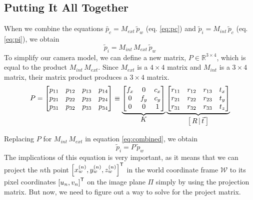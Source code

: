 \subsection{Putting It All Together}

When we combine the equations $\widetilde{p_c} = M_{ext}\,\widetilde{p}_w$ (eq. \ref{eq:pc}) and $\widetilde{p}_i = M_{int}\,\widetilde{p}_c$ (eq. \ref{eq:pi}), we obtain
\begin{equation} \label{eq:combined}
    \widetilde{p}_{i} = M_{int}\,M_{ext}\,\widetilde{p}_{w}
\end{equation}
To simplify our camera model, we can define a new matrix, $P \in \mathbb{R}^{3 \times 4}$, which is equal to the product $M_{int}\,M_{ext}$. Since $M_{ext}$ is a $4 \times 4$ matrix and $M_{int}$ is a $3 \times 4$ matrix, their matrix product produces a $3 \times 4$ matrix.
\begin{equation}  
    P=
    \begin{bmatrix}
        p_{11} & p_{12} & p_{13} & p_{14} \\
        p_{21} & p_{22} & p_{23} & p_{24} \\
        p_{31} & p_{32} & p_{33} & p_{34}
    \end{bmatrix}
    \equiv
    \underbrace{
        \begin{bmatrix}
            f_x & 0   & c_x  \\
            0   & f_y & c_y  \\
            0   & 0   & 1   
        \end{bmatrix}
    }_{\mathlarger{K}}
    \underbrace{
        \begin{bmatrix}
            r_{11} & r_{12} & r_{13} & t_x \\
            r_{21} & r_{22} & r_{23} & t_y \\
            r_{31} & r_{32} & r_{33} & t_z \\
        \end{bmatrix}
    }_{\mathlarger{\left[\,R\,\vert\,\vec{t}\:\right]}}
\end{equation}

Replacing $P$ for $M_{int}\,M_{ext}$ in equation \ref{eq:combined}, we obtain
\begin{equation} \label{eq:project}
    \widetilde{p}_{i} = P\,\widetilde{p}_{w}
\end{equation}
The implications of this equation is very important, as it means that we can project the $n$th point $\left[ x_w^{(n)}, y_w^{(n)}, z_w^{(n)} \right]^{\mathsf{T}}$ in the world coordinate frame $\mathcal{W}$ to its pixel coordinates $\left[ u_n, v_n \right]^{\mathsf{T}}$ on the image plane $\Pi$ simply by using the projection matrix. But now, we need to figure out a way to solve for the project matrix. 

